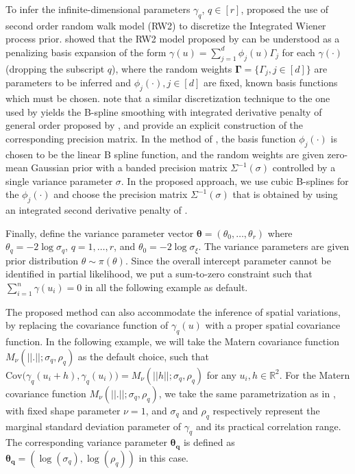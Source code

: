 \documentclass[ba]{imsart}
\begin{document}
To infer the infinite-dimensional parameters $\gamma_q$, $q \in [r]$, \cite{rw2} proposed the use of second order random walk model (RW2) to discretize the Integrated Wiener process prior. \cite{SPDEandPspline} showed that the RW2 model proposed by \cite{rw2} can be understood as a penalizing basis expansion of the form $\gamma(u) = \sum_{j=1}^{d}\phi_{j}(u)\Gamma_{j}$ for each $\gamma(\cdot)$ (dropping the subscript $q$), where the random weights $\boldsymbol{\Gamma} = \{\Gamma_{j},j\in[d]\}$ are parameters to be inferred and $\phi_{j}(\cdot),j\in[d]$ are fixed, known basis functions which must be chosen. 
\cite{adaptivesmoothingsplines} note that a similar discretization technique to the one used by \cite{rw2} yields the B-spline smoothing with integrated derivative penalty of general order proposed by \cite{osullivanspline}, and \cite{derivativepenalties} provide an explicit construction of the corresponding precision matrix.
In the method of \cite{rw2}, the basis function $\phi_{j}(\cdot)$ is chosen to be the linear B spline function, and the random weights are given zero-mean Gaussian prior with a banded precision matrix $\Sigma^{-1}(\sigma)$ controlled by a single variance parameter $\sigma$.
In the proposed approach, we use cubic B-splines for the $\phi_{j}(\cdot)$ and choose the precision matrix $\Sigma^{-1}(\sigma)$ that is obtained by using an integrated second derivative penalty of \cite{derivativepenalties}.

Finally, define the variance parameter vector $\boldsymbol{\theta} = (\theta_{0},\ldots,\theta_{r})$ where $\theta_{q} = -2\log\sigma_{q}$, $q = 1,\ldots,r$, and $\theta_{0} = -2\log\sigma_{\xi}$. The variance parameters are given prior distribution $\theta \sim \pi(\theta)$. Since the overall intercept parameter cannot be identified in partial likelihood, we put a sum-to-zero constraint such that $\sum_{i=1}^{n} \gamma{(u_i)} = 0$ in all the following example as default.

The proposed method can also accommodate the inference of spatial variations, by replacing the covariance function of $\gamma_q(u)$ with a proper spatial covariance function. In the following example, we will take the Matern covariance function $M_\nu(||.||;\sigma_q,\rho_q)$ as the default choice, such that $\text{Cov}\big(\gamma_q(u_i+h),\gamma_q(u_i)\big) = M_\nu(||h||;\sigma_q,\rho_q)$ for any $u_i, h \in \mathbb{R}^2$. For the Matern covariance function $M_\nu(||.||;\sigma_q,\rho_q)$, we take the same parametrization as in \cite{brown2015model}, with fixed shape parameter $\nu = 1$, and $\sigma_q$ and $\rho_q$ respectively represent the marginal standard deviation parameter of $\gamma_q$ and its practical correlation range. The corresponding variance parameter $\boldsymbol{\theta_q}$ is defined as $\boldsymbol{\theta_q} = (\log(\sigma_q), \log(\rho_q))$ in this case.
\end{document}
